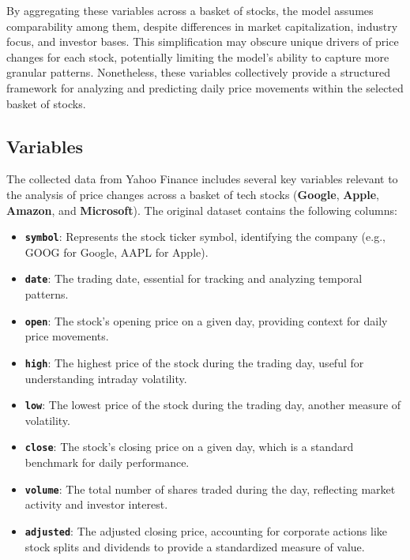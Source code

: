 \documentclass[
  letterpaper,
  DIV=11,
  numbers=noendperiod]{scrartcl}
\providecommand{\tightlist}{%
  \setlength{\itemsep}{0pt}\setlength{\parskip}{0pt}}\usepackage{longtable,booktabs,array}
\begin{document}
By aggregating these variables across a basket of stocks, the model
assumes comparability among them, despite differences in market
capitalization, industry focus, and investor bases. This simplification
may obscure unique drivers of price changes for each stock, potentially
limiting the model's ability to capture more granular patterns.
Nonetheless, these variables collectively provide a structured framework
for analyzing and predicting daily price movements within the selected
basket of stocks.

\subsection{Variables}\label{variables}

The collected data from Yahoo Finance includes several key variables
relevant to the analysis of price changes across a basket of tech stocks
(\textbf{Google}, \textbf{Apple}, \textbf{Amazon}, and
\textbf{Microsoft}). The original dataset contains the following
columns:

\begin{itemize}
\tightlist
\item
  \textbf{\texttt{symbol}}: Represents the stock ticker symbol,
  identifying the company (e.g., GOOG for Google, AAPL for Apple).
\item
  \textbf{\texttt{date}}: The trading date, essential for tracking and
  analyzing temporal patterns.
\item
  \textbf{\texttt{open}}: The stock's opening price on a given day,
  providing context for daily price movements.
\item
  \textbf{\texttt{high}}: The highest price of the stock during the
  trading day, useful for understanding intraday volatility.
\item
  \textbf{\texttt{low}}: The lowest price of the stock during the
  trading day, another measure of volatility.
\item
  \textbf{\texttt{close}}: The stock's closing price on a given day,
  which is a standard benchmark for daily performance.
\item
  \textbf{\texttt{volume}}: The total number of shares traded during the
  day, reflecting market activity and investor interest.
\item
  \textbf{\texttt{adjusted}}: The adjusted closing price, accounting for
  corporate actions like stock splits and dividends to provide a
  standardized measure of value.
\end{itemize}
\end{document}
